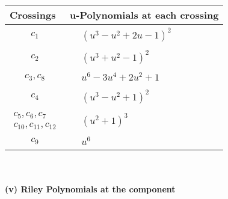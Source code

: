 \documentclass[1p]{elsarticle_modified}
\theoremstyle{definition}
\begin{document}
\begin{tabular}{m{50pt}|m{274pt}}
Crossings & \hspace{64pt}u-Polynomials at each crossing \\
\hline $$\begin{aligned}c_{1}\end{aligned}$$&$\begin{aligned}
&(u^3- u^2+2 u-1)^2
\end{aligned}$\\
\hline $$\begin{aligned}c_{2}\end{aligned}$$&$\begin{aligned}
&(u^3+u^2-1)^2
\end{aligned}$\\
\hline $$\begin{aligned}c_{3},c_{8}\end{aligned}$$&$\begin{aligned}
&u^6-3 u^4+2 u^2+1
\end{aligned}$\\
\hline $$\begin{aligned}c_{4}\end{aligned}$$&$\begin{aligned}
&(u^3- u^2+1)^2
\end{aligned}$\\
\hline $$\begin{aligned}c_{5},c_{6},c_{7}\\c_{10},c_{11},c_{12}\end{aligned}$$&$\begin{aligned}
&(u^2+1)^3
\end{aligned}$\\
\hline $$\begin{aligned}c_{9}\end{aligned}$$&$\begin{aligned}
&u^6
\end{aligned}$\\
\hline
\end{tabular}\\~\\
\newpage\renewcommand{\arraystretch}{1}
\flushleft \textbf{(v) Riley Polynomials at the component}\newline \\
\end{document}
